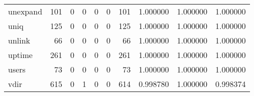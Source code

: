\begin{tabular}{lrrrrrrrrr}
unexpand  &                                   101 &                                                  0 &                                                  0 &                                                  0 &                                                  0 &                                                101 &                                           1.000000 &                               1.000000 &                             1.000000 \\
uniq      &                                   125 &                                                  0 &                                                  0 &                                                  0 &                                                  0 &                                                125 &                                           1.000000 &                               1.000000 &                             1.000000 \\
unlink    &                                    66 &                                                  0 &                                                  0 &                                                  0 &                                                  0 &                                                 66 &                                           1.000000 &                               1.000000 &                             1.000000 \\
uptime    &                                   261 &                                                  0 &                                                  0 &                                                  0 &                                                  0 &                                                261 &                                           1.000000 &                               1.000000 &                             1.000000 \\
users     &                                    73 &                                                  0 &                                                  0 &                                                  0 &                                                  0 &                                                 73 &                                           1.000000 &                               1.000000 &                             1.000000 \\
vdir      &                                   615 &                                                  0 &                                                  1 &                                                  0 &                                                  0 &                                                614 &                                           0.998780 &                               1.000000 &                             0.998374 \\

\end{tabular}
